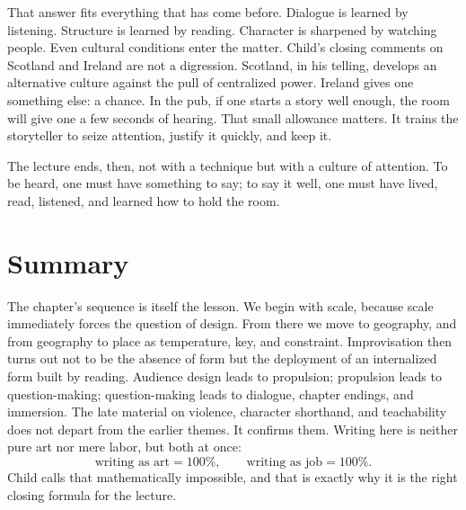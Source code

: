 That answer fits everything that has come before. Dialogue is learned by listening. Structure is learned by reading. Character is sharpened by watching people. Even cultural conditions enter the matter. Child's closing comments on Scotland and Ireland are not a digression. Scotland, in his telling, develops an alternative culture against the pull of centralized power. Ireland gives one something else: a chance. In the pub, if one starts a story well enough, the room will give one a few seconds of hearing. That small allowance matters. It trains the storyteller to seize attention, justify it quickly, and keep it.

The lecture ends, then, not with a technique but with a culture of attention. To be heard, one must have something to say; to say it well, one must have lived, read, listened, and learned how to hold the room.

\section{Summary}

The chapter's sequence is itself the lesson. We begin with scale, because scale immediately forces the question of design. From there we move to geography, and from geography to place as temperature, key, and constraint. Improvisation then turns out not to be the absence of form but the deployment of an internalized form built by reading. Audience design leads to propulsion; propulsion leads to question-making; question-making leads to dialogue, chapter endings, and immersion. The late material on violence, character shorthand, and teachability does not depart from the earlier themes. It confirms them. Writing here is neither pure art nor mere labor, but both at once:
\begin{equation}
\text{writing as art} = 100\%, \qquad \text{writing as job} = 100\%.
\end{equation}
Child calls that mathematically impossible, and that is exactly why it is the right closing formula for the lecture.